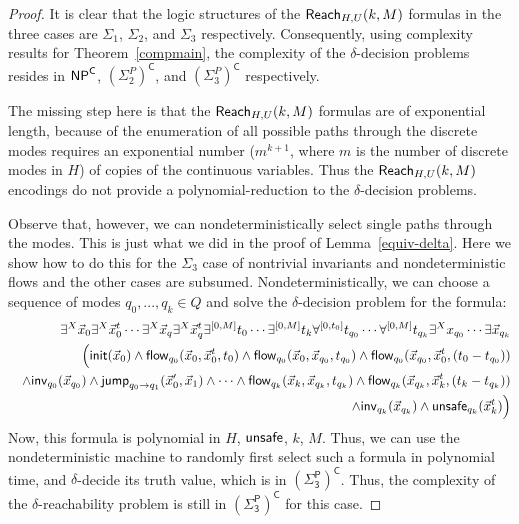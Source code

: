 \documentclass[12pt]{article}
\begin{document}
\begin{proof}
It is clear that the logic structures of the $\mathsf{Reach}_{H,U}(k,M)$ formulas in the three cases are $\Sigma_1$, $\Sigma_2$, and $\Sigma_3$ respectively. Consequently, using complexity results for Theorem~\ref{compmain}, the complexity of the $\delta$-decision problems resides in $\mathsf{NP}^{\mathsf{C}}$, $(\Sigma_2^P)^{\mathsf{C}}$, and $(\Sigma_3^P)^{\mathsf{C}}$ respectively.

The missing step here is that the $\mathsf{Reach}_{H,U}(k,M)$ formulas are of exponential length, because of the enumeration of all possible paths through the discrete modes requires an exponential number ($m^{k+1}$, where $m$ is the number of discrete modes in $H$) of copies of the continuous variables. Thus the $\mathsf{Reach}_{H,U}(k,M)$ encodings do not provide a polynomial-reduction to the $\delta$-decision problems.

Observe that, however, we can nondeterministically select single paths through the modes. This is just what we did in the proof of Lemma~\ref{equiv-delta}. Here we show how to do this for the $\Sigma_3$ case of nontrivial invariants and nondeterministic flows and the other cases are subsumed. Nondeterministically, we can choose a sequence of modes $q_0,...,q_k\in Q$ and solve the $\delta$-decision problem for the formula:
\begin{eqnarray*}
& &\exists^X \vec x_0 \exists^X \vec x_0^t\cdots \exists^X \vec x_q \exists^X \vec x_q^t
\exists^{[0,M]} t_0\cdots \exists^{[0,M]} t_k\forall^{[0,t_0]}t_{q_0} \cdots \forall^{[0,M]} t_{q_k}\exists^X
x_{q_0}\cdots\exists\vec x_{q_{k}}\\
& & \Big(\mathsf{init}(\vec x_0)\wedge \mathsf{flow}_{q_0}(\vec x_0, \vec x_0^t, t_0)\wedge \mathsf{flow}_{q_0}(\vec x_0, \vec x_{q_0}, t_{q_0})\wedge \mathsf{flow}_{q_0}(\vec x_{q_0}, \vec x_0^t, (t_0-t_{q_0}))\\
& &\wedge\mathsf{inv}_{q_0}(\vec x_{q_0})\wedge \mathsf{jump}_{q_0\rightarrow q_1}(\vec x_0', \vec x_1)\wedge \cdots\wedge \mathsf{flow}_{q_k}(\vec x_k, \vec x_{q_k}, t_{q_k})\wedge \mathsf{flow}_{q_k}(\vec x_{q_k}, \vec x_k^t, (t_k-t_{q_k}))\\
& &\wedge\mathsf{inv}_{q_k}(\vec x_{q_k})\wedge\mathsf{unsafe}_{q_k}(\vec x_k^t)\Big)
\end{eqnarray*}
Now, this formula is polynomial in $H$, $\mathsf{unsafe}$, $k$, $M$. Thus, we can use the
nondeterministic machine to randomly first select such a formula in polynomial
time, and $\delta$-decide its truth value, which is in $\mathsf{(\Sigma_3^P)^C}$. Thus, the complexity of the $\delta$-reachability problem is still in $\mathsf{(\Sigma_3^P)^C}$ for this case.
\end{proof}
\end{document}
